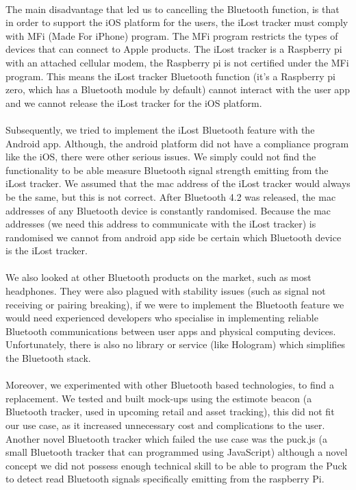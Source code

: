 \documentclass[12pt,a4paper]{article}
\begin{document}
        \paragraph{} The main disadvantage that led us to cancelling the Bluetooth function, is that in order to support the iOS platform for the users, the iLost tracker must comply with MFi (Made For iPhone) program. The MFi program restricts the types of devices that can connect to Apple products. The iLost tracker is a Raspberry pi with an attached cellular modem, the Raspberry pi is not certified under the MFi program. This means the iLost tracker Bluetooth function (it’s a Raspberry pi zero, which has a Bluetooth module by default) cannot interact with the user app and we cannot release the iLost tracker for the iOS platform.
        
        \paragraph{} Subsequently, we tried to implement the iLost Bluetooth feature with the Android app. Although, the android platform did not have a compliance program like the iOS, there were other serious issues. We simply could not find the functionality to be able measure Bluetooth signal strength emitting from the iLost tracker.  We assumed that the mac address of the iLost tracker would always be the same, but this is not correct. After Bluetooth 4.2 was released, the mac addresses of any Bluetooth device is constantly randomised. Because the mac addresses (we need this address to communicate with the iLost tracker) is randomised we cannot from android app side be certain which Bluetooth device is the iLost tracker. 
        
        \paragraph{} We also looked at other Bluetooth products on the market, such as most headphones. They were also plagued with stability issues (such as signal not receiving or pairing breaking), if we were to implement the Bluetooth feature we would need experienced developers who specialise in implementing reliable Bluetooth communications between user apps and physical computing devices. Unfortunately, there is also no library or service (like Hologram) which simplifies the Bluetooth stack. 
        
        \paragraph{} Moreover, we experimented with other Bluetooth based technologies, to find a replacement. We tested and built mock-ups using the estimote beacon (a Bluetooth tracker, used in upcoming retail and asset tracking), this did not fit our use case, as it increased unnecessary cost and complications to the user. Another novel Bluetooth tracker which failed the use case was the puck.js (a small Bluetooth tracker that can programmed using JavaScript) although a novel concept we did not possess enough technical skill to be able to program the Puck to detect read Bluetooth signals specifically emitting from the raspberry Pi. 
        
\end{document}
